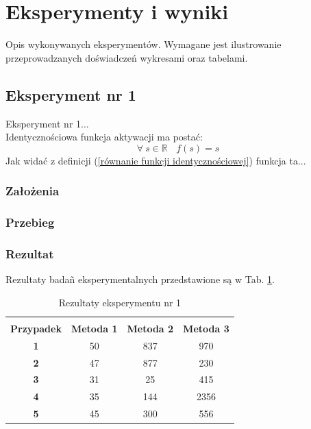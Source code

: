 \documentclass[12pt]{article}
\begin{document}
\section{Eksperymenty i wyniki}

Opis wykonywanych eksperymentów. Wymagane jest ilustrowanie przeprowadzanych doświadczeń wykresami oraz tabelami.


\subsection{Eksperyment nr 1}

Eksperyment nr 1...\\
Identycznościowa funkcja aktywacji ma postać:
\begin{equation}
 \forall\: s \in \mathbb{R}\:\:\:\: f(s) = s
 \label{równanie funkcji identycznościowej}
\end{equation}
Jak widać z definicji (\ref{równanie funkcji identycznościowej}) funkcja ta...

\subsubsection{Założenia}

\subsubsection{Przebieg}
\newpage

\subsubsection{Rezultat}

Rezultaty badañ eksperymentalnych przedstawione są w Tab. \ref{wyniki eksperymentu pierwszego}.
\begin{table}[h!]
 \caption{Rezultaty eksperymentu nr 1}
 \centering
 \vspace{0.2cm}
 \begin{tabular}{c c c c}
  \hline\hline\\[-0.4cm]
  \textbf{Przypadek} & \textbf{Metoda 1} & \textbf{Metoda 2} & \textbf{Metoda 3}\\[0.1cm]
  \hline
  \textbf{1} & 50 & 837 & 970  \\
  \textbf{2} & 47 & 877 & 230  \\
  \textbf{3} & 31 &  25 & 415  \\
  \textbf{4} & 35 & 144 & 2356 \\
  \textbf{5} & 45 & 300 & 556  \\ [0.1cm]
  \hline
 \end{tabular}
 \label{wyniki eksperymentu pierwszego}
\end{table}
\end{document}
